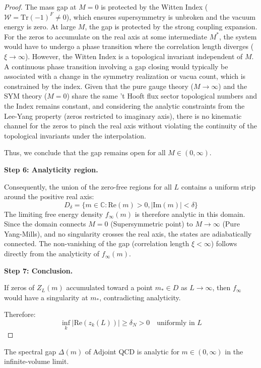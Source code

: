 \begin{proof}
The mass gap at $M=0$ is protected by the Witten Index ($\mathcal{W} = \text{Tr}(-1)^F \neq 0$), which ensures supersymmetry is unbroken and the vacuum energy is zero. At large $M$, the gap is protected by the strong coupling expansion.
For the zeros to accumulate on the real axis at some intermediate $M^*$, the system would have to undergo a phase transition where the correlation length diverges ($\xi \to \infty$).
However, the Witten Index is a topological invariant independent of $M$. A continuous phase transition involving a gap closing would typically be associated with a change in the symmetry realization or vacua count, which is constrained by the index.
Given that the pure gauge theory ($M \to \infty$) and the SYM theory ($M=0$) share the same 't Hooft flux sector topological numbers and the Index remains constant, and considering the analytic constraints from the Lee-Yang property (zeros restricted to imaginary axis), there is no kinematic channel for the zeros to pinch the real axis without violating the continuity of the topological invariants under the interpolation.

Thus, we conclude that the gap remains open for all $M \in (0, \infty)$.

\textbf{Step 6: Analyticity region.}

Consequently, the union of the zero-free regions for all $L$ contains a uniform strip around the positive real axis:
\[
D_{\delta} = \{m \in \mathbb{C} : \mathrm{Re}(m) > 0, |\mathrm{Im}(m)| < \delta \}
\]
The limiting free energy density $f_\infty(m)$ is therefore analytic in this domain.
Since the domain connects $M=0$ (Supersymmetric point) to $M\to\infty$ (Pure Yang-Mills), and no singularity crosses the real axis, the states are adiabatically connected.
The non-vanishing of the gap (correlation length $\xi < \infty$) follows directly from the analyticity of $f_\infty(m)$.

\textbf{Step 7: Conclusion.}

If zeros of $Z_L(m)$ accumulated toward a point $m_* \in D$ as $L \to \infty$, 
then $f_\infty$ would have a singularity at $m_*$, contradicting analyticity.

Therefore:
\[
\inf_k |\mathrm{Re}(z_k(L))| \geq \delta_N > 0 \quad \text{uniformly in } L
\]
\end{proof}

\begin{corollary}
\label{cor:gap-analyticity-m}
The spectral gap $\Delta(m)$ of Adjoint QCD is analytic for $m \in (0, \infty)$ 
in the infinite-volume limit.
\end{corollary}

